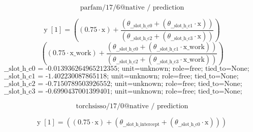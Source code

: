 \noindent {}\par
\noindent {}\par
\[\text{parfam/17/6@native / prediction}\]
\noindent {}\par
\[\text{y}\;[\text{1}] = \left(\left(0.75 \cdot \text{x}\right) + \frac{\left(\theta_{\text{\_\_slot\_h\_c0}} + \left(\theta_{\text{\_\_slot\_h\_c1}} \cdot \text{x}\right)\right)}{\left(\theta_{\text{\_\_slot\_h\_c2}} + \left(\theta_{\text{\_\_slot\_h\_c3}} \cdot \text{x}\right)\right)}\right)\]
\[\left(\left(0.75 \cdot \text{x\_work}\right) + \frac{\left(\theta_{\text{\_\_slot\_h\_c0}} + \left(\theta_{\text{\_\_slot\_h\_c1}} \cdot \text{x\_work}\right)\right)}{\left(\theta_{\text{\_\_slot\_h\_c2}} + \left(\theta_{\text{\_\_slot\_h\_c3}} \cdot \text{x\_work}\right)\right)}\right)\]
\[\text{\_\_slot\_h\_c0 = -0.013936264965212355; unit=unknown; role=free; tied\_to=None; bounds=[None, None]; origin=native\_coefficient\_block}\]
\[\text{\_\_slot\_h\_c1 = -1.402230087865118; unit=unknown; role=free; tied\_to=None; bounds=[None, None]; origin=native\_coefficient\_block}\]
\[\text{\_\_slot\_h\_c2 = -0.7150789503926552; unit=unknown; role=free; tied\_to=None; bounds=[None, None]; origin=native\_normalized\_denominator\_coordinate}\]
\[\text{\_\_slot\_h\_c3 = -0.6990437001399401; unit=unknown; role=free; tied\_to=None; bounds=[None, None]; origin=native\_normalized\_denominator\_coordinate}\]
\noindent {}\par
\noindent {}\par
\noindent {}\par
\noindent {}\par
\[\text{torchsisso/17/0@native / prediction}\]
\noindent {}\par
\[\text{y}\;[\text{1}] = \left(\left(0.75 \cdot \text{x}\right) + \left(\theta_{\text{\_\_slot\_h\_intercept}} + \left(\theta_{\text{\_\_slot\_h\_c0}} \cdot \text{x}\right)\right)\right)\]
